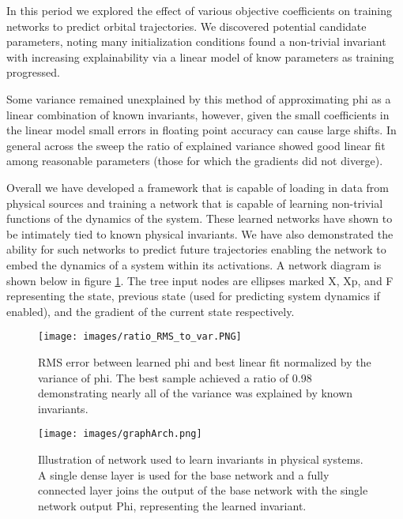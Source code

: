 \documentclass[10pt,letterpaper]{report}
\author{Brandon Houghton}
\begin{document}
In this period we explored the effect of various objective coefficients on training networks to predict orbital trajectories. We discovered potential candidate parameters, noting many initialization conditions found a non-trivial invariant with increasing explainability via a linear model of know parameters as training progressed. 

Some variance remained unexplained by this method of approximating phi as a linear combination of known invariants, however, given the small coefficients in the linear model small errors in floating point accuracy can cause large shifts. In general across the sweep the ratio of explained variance showed good linear fit among reasonable parameters (those for which the gradients did not diverge). 

Overall we have developed a framework that is capable of loading in data from physical sources and training a network that is capable of learning non-trivial functions of the dynamics of the system. These learned networks have shown to be intimately tied to known physical invariants. We have also demonstrated the ability for such networks to predict future trajectories enabling the network to embed the dynamics of a system within its activations. A network diagram is shown below in figure \ref{graph}. The tree input nodes are ellipses marked X, Xp, and F representing the state, previous state (used for predicting system dynamics if enabled), and the gradient of the current state respectively.



\begin{figure}
	\begin{center}
		\texttt{[image: images/ratio\_RMS\_to\_var.PNG]}
		\caption{\small RMS error between learned phi and best linear fit normalized by the variance of phi. The best sample achieved a ratio of  0.98 demonstrating nearly all of the variance was explained by known invariants. }
	\end{center}	
\end{figure}




\begin{figure}
	\begin{center}
		\texttt{[image: images/graphArch.png]}
		\caption{\small Illustration of network used to learn invariants in physical systems. A single dense layer is used for the base network and a fully connected layer joins the output of the base network with the single network output Phi, representing the learned invariant.}
		\label{graph}
	\end{center}	
\end{figure}
\end{document}
